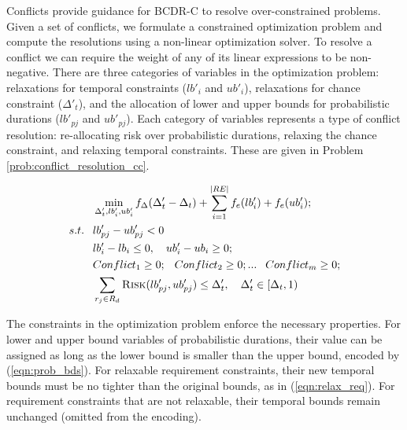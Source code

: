 \documentclass[jair,twoside,11pt,theapa]{article}
\begin{document}
Conflicts provide guidance for BCDR-C to resolve over-constrained problems. Given
a set of conflicts, we formulate a constrained optimization problem and compute
the resolutions using a non-linear optimization solver. To resolve a conflict we
can require the weight of any of its linear expressions to be
non-negative. There are three categories of variables in the optimization problem: relaxations
for temporal constraints ($lb'_{i}$ and $ub'_{i}$), relaxations for chance
constraint ($\Delta'_t$), and the allocation of lower and upper bounds for
probabilistic durations ($lb'_{pj}$ and $ub'_{pj}$). Each category of variables
represents a type of conflict resolution: re-allocating risk over probabilistic
durations, relaxing the chance constraint, and relaxing temporal constraints. These
are given in Problem \ref{prob:conflict_resolution_cc}.

\begin{problem}
	\begin{align}
	&\phantom{=}	\min_{\Delta'_t,{lb_i',ub_i'}}f_\Delta(\Delta'_t-\Delta_t)+\sum\limits_{i=1}^{|RE|}f_{e}(lb_i') + f_{e}(ub_i');
	\label{eqn:obj}\\
	s.t. 	&\phantom{=}	lb'_{pj} - ub'_{pj} < 0   \label{eqn:prob_bds}\\
	&\phantom{=} lb_i'-lb_i \leq 0, \quad ub_i'-ub_i \geq 0; \label{eqn:relax_req}\\
	&\phantom{=} Conflict_1 \geq 0; \phantom{=} Conflict_2 \geq 0;  ... \phantom{=} Conflict_m \geq 0; \label{eqn:conf_res_cc}\\
	&\phantom{=}	\sum_{r_j\in R_d}\textsc{Risk}(lb'_{pj},ub'_{pj}) \leq \Delta'_t, \quad \Delta'_t \in \left[\Delta_t,1\right) \label{eqn:cc}
	\end{align}
	\label{prob:conflict_resolution_cc}
\end{problem}

The constraints in the optimization problem enforce the necessary properties.
For lower and upper bound variables of probabilistic durations, their value can
be assigned as long as the lower bound is smaller than the upper bound,
encoded by (\ref{eqn:prob_bds}). For relaxable requirement constraints, their new
temporal bounds must be no tighter than the original bounds, as in
(\ref{eqn:relax_req}). For requirement constraints that are not relaxable, their
temporal bounds remain unchanged (omitted from the encoding).
\end{document}
